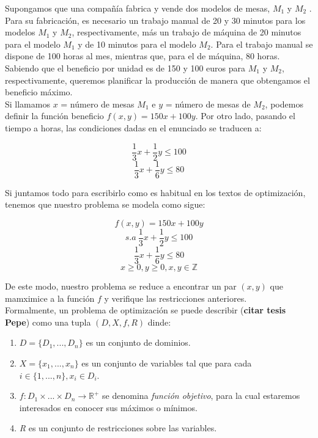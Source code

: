 \documentclass[a4paper, 12pt, oneside]{book}
\begin{document}
	Supongamos que una compa\~{n}\'ia fabrica y vende dos modelos de mesas, $M_{1}$ y $M_{2}$ . Para su fabricaci\'on, es necesario un trabajo manual de 20 y 30 minutos para los modelos $M_{1}$ y $M_{2}$, respectivamente, m\'as un trabajo de m\'aquina de 20 minutos para el modelo $M_{1}$  y de 10 minutos para el modelo $M_{2}$. Para el trabajo manual se dispone de 100 horas al mes, mientras que, para el de m\'aquina, 80 horas. Sabiendo que el beneficio por unidad es de 150 y 100 euros para $M_{1}$ y $M_{2}$, respectivamente, queremos planificar la producci\'on de manera que obtengamos el beneficio m\'aximo.
	\\
	
	Si llamamos $x$ = n\'umero de mesas $M_{1}$ e $y$ = n\'umero de mesas de $M_{2}$, podemos definir la funci\'on beneficio $f(x,y) = 150x + 100y$. Por otro lado, pasando el tiempo a horas, las condiciones dadas en el enunciado se traducen a:
	
	$$\frac{1}{3}x + \frac{1}{2}y \leq 100$$
	$$\frac{1}{3}x + \frac{1}{6}y \leq 80$$
	
	Si juntamos todo para escribirlo como es habitual en los textos de optimizaci\'on, tenemos que nuestro problema se modela como sigue:
	
	$$f(x,y) = 150x + 100y$$
	$$s.a\ \frac{1}{3}x + \frac{1}{2}y \leq 100$$
	$$\frac{1}{3}x + \frac{1}{6}y \leq 80$$
	$$x\geq 0, y\geq 0, x,y \in \mathbb{Z} $$
	
	De este modo, nuestro problema se reduce a encontrar un par $(x,y)$ que mamximice a la funci\'on $f$ y verifique las restricciones anteriores.
	\\
	
	Formalmente, un problema de optimizaci\'on se puede describir (\textbf{citar tesis Pepe}) como una tupla $(D, X, f, R)$ dinde:
	
	\begin{enumerate}
		\item $D = \{D_{1},...,D_{n}\}$ es un conjunto de dominios.
		\item $X = \{x_{1},...,x_{n}\}$ es un conjunto de variables tal que para cada $i\in \{1,...,n\}, x_{i} \in D_{i}$.
		\item $f : D_{1} \times ... \times D_{n} \longrightarrow \mathbb{R^{+}}$ se denomina \textit{funci\'on objetivo}, para la cual estaremos interesados en conocer sus m\'aximos o m\'inimos.
		\item \textit{R} es un conjunto de restricciones sobre las variables.
	\end{enumerate}
	
\end{document}
